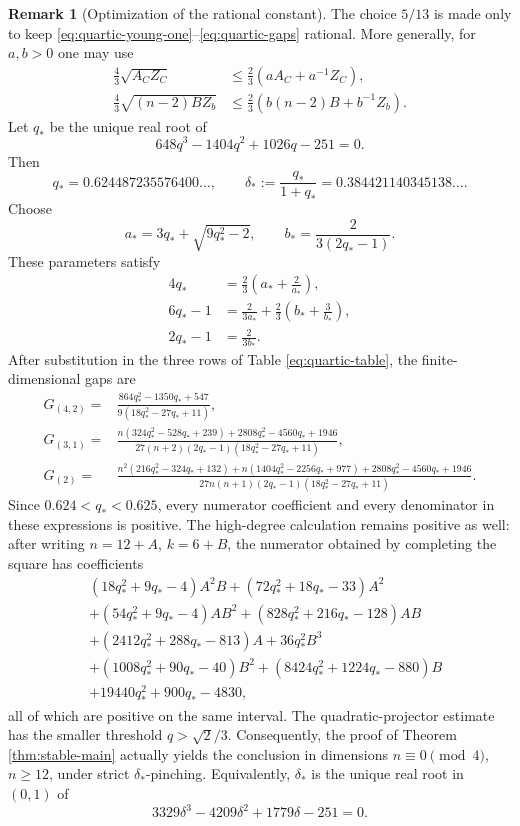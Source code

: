 \documentclass[reqno,11pt]{amsart}
\theoremstyle{definition}
\newtheorem{remark}[theorem]{Remark}
\begin{document}
\begin{remark}[Optimization of the rational constant]
\label{rem:optimized-constant}
The choice $5/13$ is made only to keep
\eqref{eq:quartic-young-one}--\eqref{eq:quartic-gaps} rational.  More
generally, for $a,b>0$ one may use
\begin{align*}
 \frac43\sqrt{A_CZ_C}
 &\leq\frac23\left(aA_C+a^{-1}Z_C\right),\\
 \frac43\sqrt{(n-2)BZ_b}
 &\leq\frac23\left(b(n-2)B+b^{-1}Z_b\right).
\end{align*}
Let $q_*$ be the unique real root of
\begin{equation*}
 648q^3-1404q^2+1026q-251=0.
\end{equation*}
Then
$$
 q_*=0.624487235576400\ldots,
 \qquad
 \delta_*:=\frac{q_*}{1+q_*}
 =0.384421140345138\ldots.
$$
Choose
$$
 a_*=3q_*+\sqrt{9q_*^2-2},
 \qquad
 b_*=\frac{2}{3(2q_*-1)}.
$$
These parameters satisfy
\begin{align*}
 4q_*&=\frac23\left(a_*+\frac2{a_*}\right),\\
 6q_*-1&=\frac{2}{3a_*}
 +\frac23\left(b_*+\frac3{b_*}\right),\\
 2q_*-1&=\frac{2}{3b_*}.
\end{align*}
After substitution in the three rows of
Table \eqref{eq:quartic-table}, the finite-dimensional gaps are
\begin{align*}
 G_{(4,2)}={}&
 \frac{864q_*^2-1350q_*+547}
 {9(18q_*^2-27q_*+11)},\\
 G_{(3,1)}={}&
 \frac{n(324q_*^2-528q_*+239)
       +2808q_*^2-4560q_*+1946}
 {27(n+2)(2q_*-1)(18q_*^2-27q_*+11)},\\
 G_{(2)}={}&
 \frac{n^2(216q_*^2-324q_*+132)
       +n(1404q_*^2-2256q_*+977)
       +2808q_*^2-4560q_*+1946}
 {27n(n+1)(2q_*-1)(18q_*^2-27q_*+11)}.
\end{align*}
Since $0.624<q_*<0.625$, every numerator coefficient and every denominator
in these expressions is positive.  The high-degree calculation remains
positive as well: after writing $n=12+A$, $k=6+B$, the numerator obtained by
completing the square has coefficients
\begin{align*}
 &(18q_*^2+9q_*-4)A^2B+(72q_*^2+18q_*-33)A^2\\
 &+(54q_*^2+9q_*-4)AB^2+(828q_*^2+216q_*-128)AB\\
 &+(2412q_*^2+288q_*-813)A+36q_*^2B^3\\
 &+(1008q_*^2+90q_*-40)B^2
 +(8424q_*^2+1224q_*-880)B\\
 &+19440q_*^2+900q_*-4830,
\end{align*}
all of which are positive on the same interval.  The quadratic-projector
estimate has the smaller threshold $q>\sqrt2/3$.  Consequently, the
proof of Theorem \ref{thm:stable-main} actually yields the conclusion in dimensions
$n\equiv0\pmod4$, $n\geq12$, under strict $\delta_*$-pinching.  Equivalently,
$\delta_*$ is the unique real root in $(0,1)$ of
$$
 3329\delta^3-4209\delta^2+1779\delta-251=0.
$$
\end{remark}
\end{document}
